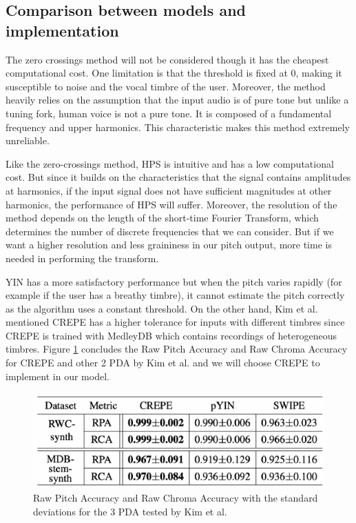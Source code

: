 \subsection{Comparison between models and implementation}
The zero crossings method will not be considered though it has the cheapest computational cost. One limitation is that
the threshold is fixed at 0, making it susceptible to noise and the vocal timbre of the user. Moreover, the method heavily relies on
the assumption that the input audio is of pure tone but unlike a tuning fork, human voice is not a pure tone. It is 
composed of a fundamental frequency and upper harmonics.  This characteristic makes this method extremely
unreliable.

Like the zero-crossings method, HPS is intuitive and has a low computational cost. But since it builds on the characteristics 
that the signal contains amplitudes at harmonics, if the input signal does not have sufficient magnitudes at other harmonics, the 
performance of HPS will suffer. Moreover, the resolution of the method depends on the length of the short-time Fourier Transform, which
determines the number of discrete frequencies that we can consider. But if we want a higher resolution and less graininess in our 
pitch output, more time is needed in performing the transform.

YIN has a more satisfactory performance but when the pitch varies rapidly (for example if the user has a breathy timbre), it cannot 
estimate the pitch correctly as the algorithm uses a constant threshold. On the other hand, Kim et al. mentioned CREPE has a higher 
tolerance for inputs with different timbres since CREPE is trained with MedleyDB which contains recordings of heterogeneous timbres. Figure 
\ref{CREPEperf} concludes the Raw Pitch Accuracy and Raw Chroma Accuracy for CREPE and other 2 PDA by Kim et al. and we will choose CREPE 
to implement in our model.

\begin{figure}[h]
	\centering
	\includegraphics[width=0.8\columnwidth]{Figures/CREPEperf.png}
	\caption{Raw Pitch Accuracy and Raw Chroma Accuracy with the standard deviations for the 3 PDA tested by Kim et al. }
	\label{CREPEperf}
\end{figure}

